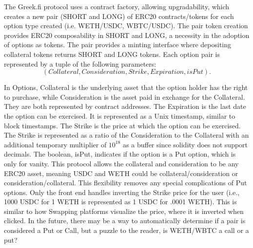 \documentclass[%
 reprint,
 amsmath,amssymb,
 aps,
]{revtex4-2}
\newcommand{\greekfi}{Greek.fi }
\begin{document}
The \greekfi protocol uses a contract factory, allowing upgradability, which creates a new pair (SHORT and LONG) of ERC20 contracts/tokens for each option type created (i.e. WETH/USDC, WBTC/USDC).
The pair token creation provides ERC20 composability in SHORT and LONG, a necessity in the adoption of options as tokens.
The pair provides a minting interface where depositing collateral tokens returns SHORT and LONG tokens.
Each option pair is represented by a tuple of the following parameters:
\begin{equation*}
  (Collateral, Consideration, Strike, Expiration, isPut).
\end{equation*}

In Options, Collateral is the underlying asset that the option holder has the right to purchase, while Consideration is the asset paid in exchange for the Collateral. They are both represented by contract addresses.
The Expiration is the last date the option can be exercised. 
It is represented as a Unix timestamp, similar to block timestamps.
The Strike is the price at which the option can be exercised.
The Strike is represented as a ratio of the Consideration to the Collateral with an additional temporary multiplier of $10^{18}$ as a buffer since solidity does not support decimals.
The boolean, isPut, indicates if the option is a Put option, which is only for vanity. 
This protocol allows the collateral and consideration to be any ERC20 asset, meaning USDC and WETH could be collateral/consideration or consideration/collateral. 
This flexibility removes any special complications of Put options. 
Only the front end handles inverting the Strike price for the user (i.e., 1000 USDC for 1 WETH is represented as 1 USDC for .0001 WETH). This is similar to how Swapping platforms visualize the price, where it is inverted when clicked. In the future, there may be a way to automatically determine if a pair is considered a Put or Call, but a puzzle to the reader, is WETH/WBTC a call or a put?
\end{document}

